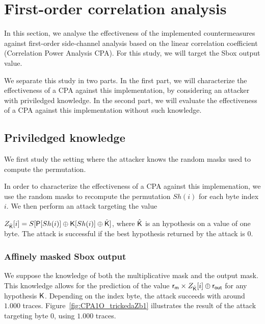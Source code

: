 \section{First-order correlation analysis}
In this section, we analyse the effectiveness of the implemented countermeasures against first-order side-channel analysis based on the linear correlation coefficient (Correlation Power Analysis CPA). For this study, we will target the Sbox output value. 

We separate this study in two parts. In the first part, we will characterize the effectiveness of a CPA against this implementation, by considering an attacker with priviledged knowledge. In the second part, we will evaluate the effectiveness of a CPA against this implementation without such knowledge.

\subsection{Priviledged knowledge}
We first study the setting where the attacker knows the random masks used to compute the permutation. 

In order to characterize the effectiveness of a CPA against this implemenation, we use the random masks to recompute the permutation $Sh(i)$ for each byte index $i$. We then perform an attack targeting the value 

\noindent $Z_{\hat{\mathsf{K}}}[i]=S[\mathsf{P}[Sh(i)] \oplus \mathsf{K}[Sh(i)] \oplus \hat{\mathsf{K}}]$, where $\hat{\mathsf{K}}$ is an hypothesis on a value of one byte.
The attack is successful if the best hypothesis returned by the attack is $0$.


\subsubsection{Affinely masked Sbox output}
We suppose the knowledge of both the multiplicative mask and the output mask. This knowledge allows for the prediction of the value $\mathsf{r_m} \times Z_{\hat{\mathsf{K}}}[i] \oplus \mathsf{r_{out}}$ for any hypothesis $\mathsf{K}$. Depending on the index byte, the attack succeeds with around $1.000$ traces.
Figure~\ref{fig:CPA1O_trickedaZb1} illustrates the result of the attack targeting byte 0, using $1.000$ traces.

